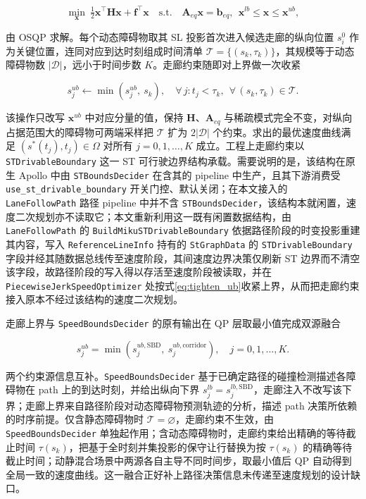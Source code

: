 \documentclass[a4paper,11pt]{ctexart}
\theoremstyle{definition}
\begin{document}
\begin{equation}
    \min_{\mathbf{x}}\ \tfrac{1}{2}\mathbf{x}^{\top}\mathbf{H}\mathbf{x} + \mathbf{f}^{\top}\mathbf{x}
    \quad \text{s.t.}\quad \mathbf{A}_{eq}\mathbf{x} = \mathbf{b}_{eq},\ \ \mathbf{x}^{lb} \leq \mathbf{x} \leq \mathbf{x}^{ub},
    \label{eq:qp_compact}
\end{equation}

由 OSQP 求解。每个动态障碍物取其 SL 投影首次进入候选走廊的纵向位置 $s_i^{0}$ 作为关键位置，连同对应到达时刻组成时间清单 $\mathcal{T} = \{(s_k, \tau_k)\}$，其规模等于动态障碍物数 $|\mathcal{D}|$，远小于时间步数 $K$。走廊约束随即对上界做一次收紧

\begin{equation}
    s_j^{ub} \leftarrow \min\!\left(s_j^{ub},\ s_k\right), \quad \forall\, j: t_j < \tau_k,\ \ \forall\, (s_k, \tau_k) \in \mathcal{T}.
    \label{eq:tighten_ub}
\end{equation}

该操作只改写 $\mathbf{x}^{ub}$ 中对应分量的值，保持 $\mathbf{H}$、$\mathbf{A}_{eq}$ 与稀疏模式完全不变，对纵向占据范围大的障碍物可两端采样把 $\mathcal{T}$ 扩为 $2|\mathcal{D}|$ 个约束。求出的最优速度曲线满足 $(s^{*}(t_j), t_j) \in \Omega$ 对所有 $j=0,1,\ldots,K$ 成立。工程上走廊约束以 \texttt{STDrivableBoundary} 这一 ST 可行驶边界结构承载。需要说明的是，该结构在原生 Apollo 中由 \texttt{STBoundsDecider} 在含其的 pipeline 中生产，且其下游消费受 \texttt{use\_st\_drivable\_boundary} 开关门控、默认关闭；在本文接入的 \texttt{LaneFollowPath} 路径 pipeline 中并不含 \texttt{STBoundsDecider}，该结构本就闲置，速度二次规划亦不读取它；本文重新利用这一既有闲置数据结构，由 \texttt{LaneFollowPath} 的 \texttt{BuildMikuSTDrivableBoundary} 依据路径阶段的时变投影重建其内容，写入 \texttt{ReferenceLineInfo} 持有的 \texttt{StGraphData} 的 \texttt{STDrivableBoundary} 字段并经其随数据总线传至速度阶段，其间速度边界决策仅刷新 ST 边界而不清空该字段，故路径阶段的写入得以存活至速度阶段被读取，并在 \texttt{PiecewiseJerkSpeedOptimizer} 处按式\eqref{eq:tighten_ub}收紧上界，从而把走廊约束接入原本不经过该结构的速度二次规划。

走廊上界与 \texttt{SpeedBoundsDecider} 的原有输出在 QP 层取最小值完成双源融合

\begin{equation}
    s_j^{ub} = \min\!\left(s_j^{ub,\mathrm{SBD}},\ s_j^{ub,\mathrm{corridor}}\right), \quad j = 0,1,\ldots,K.
    \label{eq:dual_source}
\end{equation}

两个约束源信息互补。\texttt{SpeedBoundsDecider} 基于已确定路径的碰撞检测描述各障碍物在 path 上的到达时刻，并给出纵向下界 $s_j^{lb}=s_j^{lb,\mathrm{SBD}}$，走廊注入不改写该下界；走廊上界来自路径阶段对动态障碍物预测轨迹的分析，描述 path 决策所依赖的时序前提。仅含静态障碍物时 $\mathcal{T}=\varnothing$，走廊约束不生效，由 \texttt{SpeedBoundsDecider} 单独起作用；含动态障碍物时，走廊约束给出精确的等待截止时间 $\tau(s_k)$，把基于全时刻并集投影的保守让行替换为按 $\tau(s_k)$ 的精确等待截止时间；动静混合场景中两源各自主导不同时间步，取最小值后 QP 自动得到全局一致的速度曲线。这一融合正好补上路径决策信息未传递至速度规划的设计缺口。
\end{document}
